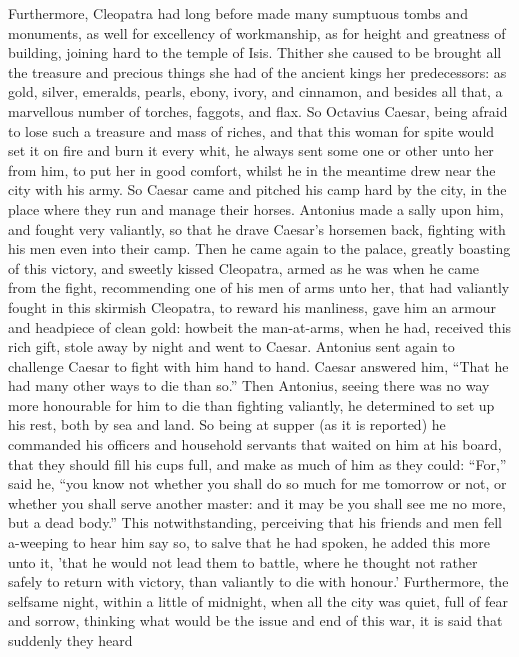 \documentclass{book}
\begin{document}
Furthermore,  Cleopatra had long before made many sumptuous tombs and
monuments, as well for excellency of workmanship, as for height and
greatness of building, joining hard to the temple of Isis. Thither she
caused to be brought all the treasure and precious things she had of
the ancient kings her predecessors: as gold, silver, emeralds, pearls,
ebony, ivory, and cinnamon, and besides all that, a marvellous number
of torches, faggots, and flax. So Octavius Caesar, being afraid to
lose such a treasure and mass of riches, and that this woman for spite
would set it on fire and burn it every whit, he always sent some one
or other unto her from him, to put her in good comfort, whilst he in
the meantime drew near the city with his army. So Caesar came and
pitched his camp hard by the city, in the place where they run and
manage their horses. Antonius made a sally upon him, and fought very
valiantly, so that he drave Caesar's horsemen back, fighting with his
men even into their camp. Then he came again to the palace, greatly
boasting of this victory, and sweetly kissed Cleopatra, armed as he
was when he came from the fight, recommending one of his men of arms
unto her, that had valiantly fought in this skirmish Cleopatra, to
reward his manliness, gave him an armour and headpiece of clean gold:
howbeit the man-at-arms, when he had, received this rich gift, stole
away by night and went to Caesar.
Antonius sent again to challenge Caesar to fight with him hand to hand.
Caesar answered him, ``That he had many other ways to die than so.'' Then
Antonius, seeing there was no way more honourable for him to die than fighting
valiantly, he determined to set up his rest, both by sea and land. So
being at supper (as it is reported) he commanded his officers and household
servants that waited on him at his board, that they should fill his cups full,
and make as much of him as they could: ``For,'' said he, ``you know not whether
you shall do so much for me tomorrow or not, or whether you shall serve
another master: and it may be you shall see me no more, but a dead body.'' This
notwithstanding, perceiving that his friends and men fell a-weeping to hear
him say so, to salve that he had spoken, he added this more unto it, 'that
he would not lead them to battle, where he thought not rather safely to return
with victory, than valiantly to die with honour.' 
Furthermore, the selfsame night, within a little of midnight, when
all the city was quiet, full of fear and sorrow, thinking what would
be the issue and end of this war, it is said that suddenly they heard
\end{document}
